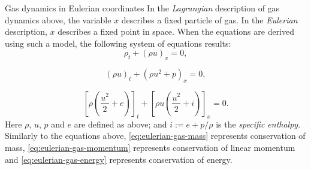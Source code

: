 \begin{Example}{Gas dynamics in Eulerian coordinates}
\label{ex:eulerian-gas-dynamics}
In the \emph{Lagrangian} description of gas dynamics above, the variable $x$ describes a fixed particle of gas. In the \emph{Eulerian} description, $x$ describes a fixed point in space. When the equations are derived using such a model, the following system of equations results:
\begin{equation}\label{eq:eulerian-gas-mass}
\rho_t+(\rho u)_x=0,
\end{equation}

\begin{equation}\label{eq:eulerian-gas-momentum}
(\rho u)_t+(\rho u^2+p)_x=0,
\end{equation}

\begin{equation}\label{eq:eulerian-gas-energy}
\left[\rho\left(\dfrac{u^2}{2}+e\right)\right]_t+\left[\rho u\left(\dfrac{u^2}{2}+i\right)\right]_x=0.
\end{equation}
Here $\rho$, $u$, $p$ and $e$ are defined as above; and $i:=e+p/\rho$ is the \emph{specific enthalpy}. Similarly to the equations above, \eqref{eq:eulerian-gas-mass} represents conservation of mass, \eqref{eq:eulerian-gas-momentum} represents conservation of linear momentum and \eqref{eq:eulerian-gas-energy} represents conservation of energy.
\end{Example}
